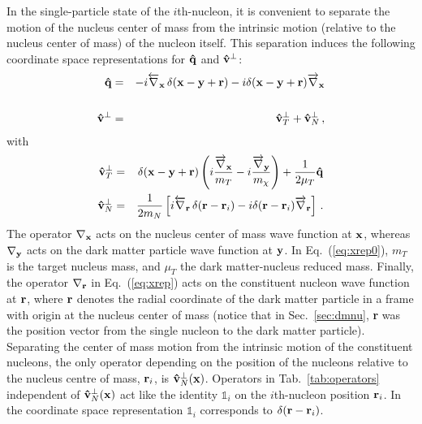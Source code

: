 \documentclass[11pt,a4paper]{article}
\begin{document}
In the single-particle state of the $i$th-nucleon, it is convenient to separate the motion of the nucleus center of mass from the intrinsic motion (relative to the nucleus center of mass) of the nucleon itself. This separation induces the following coordinate space representations for ${\bf{\hat{q}}}$ and ${\bf{\hat{v}}}^{\perp}$:
\begin{eqnarray}
\label{eq:qx}
{\bf{\hat{q}}} &=& - i \overleftarrow{\nabla}_{{\bf{x}}} \,\delta({\bf{x}}-{\bf{y}}+{\bf{r}}) - i\delta({\bf{x}}-{\bf{y}}+{\bf{r}}) \overrightarrow{\nabla}_{{\bf{x}}}  \\
\nonumber\\
\label{eq:vtvn}
{\bf{\hat{v}}}^{\perp} &=& {\bf{\hat{v}}}^{\perp}_{T} + {\bf{\hat{v}^{\perp}}}_{N}\,,
\end{eqnarray} 
with 
\begin{eqnarray}
\label{eq:xrep0}
{\bf{\hat{v}^{\perp}}}_{T} &=& \delta({\bf{x}}-{\bf{y}}+{\bf{r}}) \left( i \frac{ \overrightarrow{\nabla}_{{\bf{x}}}}{m_T}  - i \frac{\overrightarrow{\nabla}_{{\bf{y}}}}{m_\chi} \right)  + \frac{1}{2\mu_T}{\bf{\hat{q}}}
 \\ 
{\bf{\hat{v}^{\perp}}}_{N} &=& \frac{1}{2m_{N}}\left[i \overleftarrow{\nabla}_{{\bf{r}}} \,\delta({\bf{r}}-{\bf{r}}_i) - i\delta({\bf{r}}-{\bf{r}}_i) \overrightarrow{\nabla}_{{\bf{r}}}  \right] \,.
\label{eq:xrep}
\end{eqnarray} 
The operator $\nabla_{\bf{x}}$ acts on the nucleus center of mass wave function at ${\bf{x}}$, whereas $\nabla_{\bf{y}}$ acts on the dark matter particle wave function at ${\bf{y}}$.
In Eq.~(\ref{eq:xrep0}), $m_T$ is the target nucleus mass, and $\mu_T$ the dark matter-nucleus reduced mass.
Finally, the operator $\nabla_{\bf{r}}$ in Eq.~(\ref{eq:xrep}) acts on the constituent nucleon wave function at ${\bf{r}}$, where ${\bf{r}}$ denotes the radial coordinate of the dark matter particle in a frame with origin at the nucleus center of mass (notice that in Sec.~\ref{sec:dmnu}, {\bf{r}} was the position vector from the single nucleon to the dark matter particle). %
Separating the center of mass motion from the intrinsic motion of the constituent nucleons, the only operator depending on the position of the nucleons relative to the nucleus centre of mass, ${\bf{r}}_i$, is ${\bf{\hat{v}^{\perp}}}_{N}({\bf{x}})$. Operators in Tab.~\ref{tab:operators} independent of ${\bf{\hat{v}^{\perp}}}_{N}({\bf{x}})$ act like the identity $\mathbb{1}_{i}$ on the $i$th-nucleon position ${\bf{r}}_i$. In the coordinate space representation $\mathbb{1}_{i}$ corresponds to $\delta({\bf{r}}-{\bf{r}}_i)$. 
\end{document}

